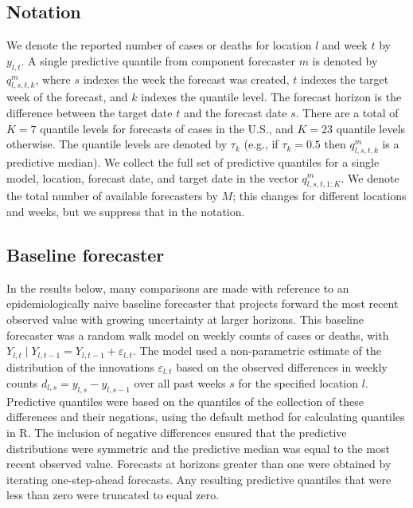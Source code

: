 \documentclass[11pt,3p,authoryear]{elsarticle}
\begin{document}
\subsection{Notation}
\label{subsec:methods_notation}

We denote the reported number of cases or deaths for location $l$ and week $t$ by $y_{l,t}$. A single predictive quantile from component forecaster $m$ is denoted by $q^m_{l,s,t,k}$, where $s$ indexes the week the forecast was created, $t$ indexes the target week of the forecast, and $k$ indexes the quantile level. The forecast horizon is the difference between the target date $t$ and the forecast date $s$. There are a total of $K = 7$ quantile levels for forecasts of cases in the U.S., and $K = 23$ quantile levels otherwise. The quantile levels are denoted by $\tau_k$ (e.g., if $\tau_k = 0.5$ then $q^m_{l,s,t,k}$ is a predictive median). We collect the full set of predictive quantiles for a single model, location, forecast date, and target date in the vector $q^m_{l,s,t,1:K}$. We denote the total number of available forecasters by $M$; this changes for different locations and weeks, but we suppress that in the notation.

\subsection{Baseline forecaster}
\label{subsec:methods_baseline}

In the results below, many comparisons are made with reference to an epidemiologically naive baseline forecaster that projects forward the most recent observed value with growing uncertainty at larger horizons. This baseline forecaster was a random walk model on weekly counts of cases or deaths, with $Y_{l,t} \mid Y_{l,t-1} = Y_{l,t-1} + \varepsilon_{l,t}$. The model used a non-parametric estimate of the distribution of the innovations $\varepsilon_{l,t}$ based on the observed differences in weekly counts $d_{l,s} = y_{l,s} - y_{l,s-1}$ over all past weeks $s$ for the specified location $l$.
Predictive quantiles were based on the quantiles of the collection of these differences and their negations, using the default method for calculating quantiles in R.
The inclusion of negative differences ensured that the predictive distributions were symmetric and the predictive median was equal to the most recent observed value.
Forecasts at horizons greater than one were obtained by iterating one-step-ahead forecasts. Any resulting predictive quantiles that were less than zero were truncated to equal zero.
\end{document}
